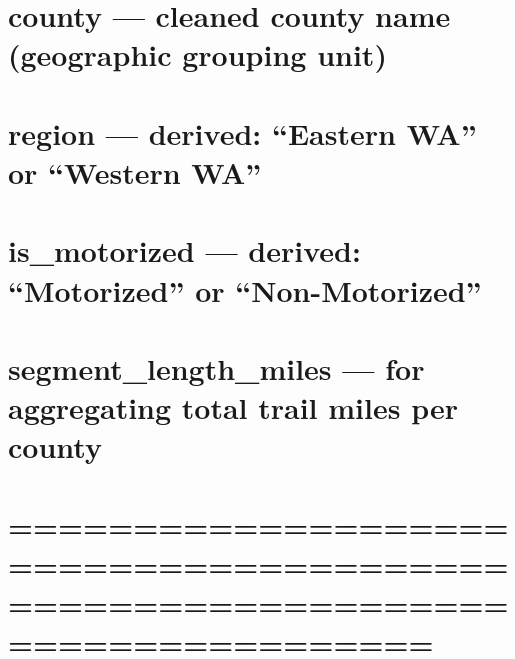 \documentclass[
]{article}
\begin{document}
\section{county --- cleaned county name (geographic grouping
unit)}\label{county-cleaned-county-name-geographic-grouping-unit}

\section{region --- derived: ``Eastern WA'' or ``Western
WA''}\label{region-derived-eastern-wa-or-western-wa}

\section{is\_motorized --- derived: ``Motorized'' or
``Non-Motorized''}\label{is_motorized-derived-motorized-or-non-motorized}

\section{segment\_length\_miles --- for aggregating total trail miles
per
county}\label{segment_length_miles-for-aggregating-total-trail-miles-per-county}

\section{=============================================================================}\label{section-17}
\end{document}
